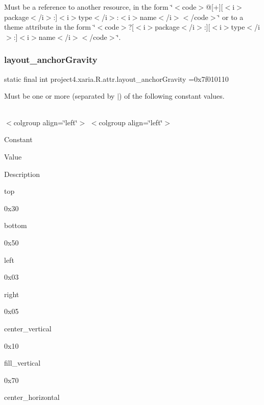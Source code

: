 Must be a reference to another resource, in the form \char`\"{}$<$code$>$@\mbox{[}+\mbox{]}\mbox{[}$<$i$>$package$<$/i$>$\+:\mbox{]}$<$i$>$type$<$/i$>$\+:$<$i$>$name$<$/i$>$$<$/code$>$\char`\"{} or to a theme attribute in the form \char`\"{}$<$code$>$?\mbox{[}$<$i$>$package$<$/i$>$\+:\mbox{]}\mbox{[}$<$i$>$type$<$/i$>$\+:\mbox{]}$<$i$>$name$<$/i$>$$<$/code$>$\char`\"{}. \mbox{\label{classproject4_1_1xaria_1_1R_1_1attr_af45845ac0dcbc590638a6c9d97510b95}} 
\subsubsection{\texorpdfstring{layout\+\_\+anchor\+Gravity}{layout\_anchorGravity}}
{\footnotesize\ttfamily static final int project4.\+xaria.\+R.\+attr.\+layout\+\_\+anchor\+Gravity =0x7f010110\hspace{0.3cm}{\ttfamily [static]}}

Must be one or more (separated by \textquotesingle{}$\vert$\textquotesingle{}) of the following constant values.

\tabulinesep=1mm
\begin{longtabu} spread 0pt [c]{*{0}{|X[-1]}|}
\hline
\end{longtabu}
$<$colgroup align=\char`\"{}left\char`\"{}$>$ $<$colgroup align=\char`\"{}left\char`\"{}$>$ 

Constant

Value

Description 

{\ttfamily top}

0x30

{\ttfamily bottom}

0x50

{\ttfamily left}

0x03

{\ttfamily right}

0x05

{\ttfamily center\+\_\+vertical}

0x10

{\ttfamily fill\+\_\+vertical}

0x70

{\ttfamily center\+\_\+horizontal}

